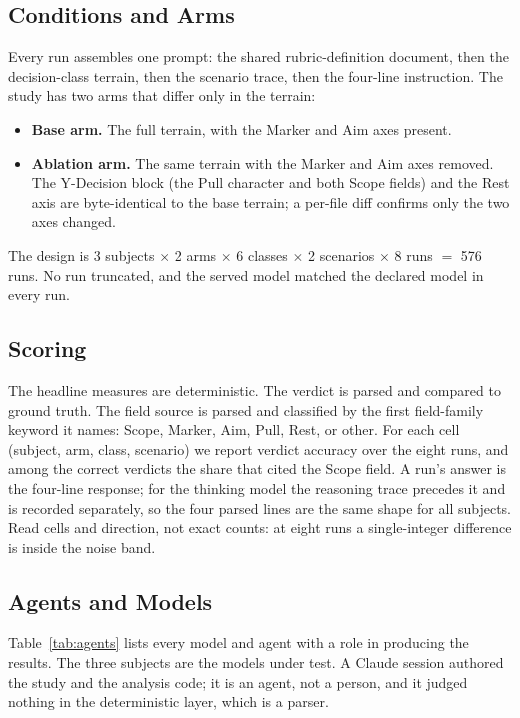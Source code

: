 \documentclass[11pt,a4paper]{article}
\begin{document}
\subsection{Conditions and Arms}

Every run assembles one prompt: the shared rubric-definition document, then the
decision-class terrain, then the scenario trace, then the four-line instruction.
The study has two arms that differ only in the terrain:

\begin{itemize}
  \item \textbf{Base arm.} The full terrain, with the Marker and Aim axes
    present.
  \item \textbf{Ablation arm.} The same terrain with the Marker and Aim axes
    removed. The Y-Decision block (the Pull character and both Scope fields) and
    the Rest axis are byte-identical to the base terrain; a
    per-file diff confirms only the two axes changed.
\end{itemize}

The design is 3 subjects $\times$ 2 arms $\times$ 6 classes $\times$ 2 scenarios
$\times$ 8 runs $=$ 576 runs. No run truncated, and the served model matched the
declared model in every run.

\subsection{Scoring}\label{sec:scoring}

The headline measures are deterministic. The verdict is parsed and compared to
ground truth. The field source is parsed and classified by the first field-family
keyword it names: Scope, Marker, Aim, Pull, Rest, or other. For each cell (subject,
arm, class, scenario) we report verdict accuracy over the eight runs, and among
the correct verdicts the share that cited the Scope field. A run's answer is the
four-line response; for the thinking model the reasoning trace precedes it and is
recorded separately, so the four parsed lines are the same shape for all subjects.
Read cells and direction, not exact counts: at eight runs a single-integer
difference is inside the noise band.

\subsection{Agents and Models}\label{sec:agents}

Table~\ref{tab:agents} lists every model and agent with a role in producing the
results. The three subjects are the models under test. A Claude session
authored the study and the analysis code; it is an agent, not a person, and it
judged nothing in the deterministic layer, which is a parser.
\end{document}

